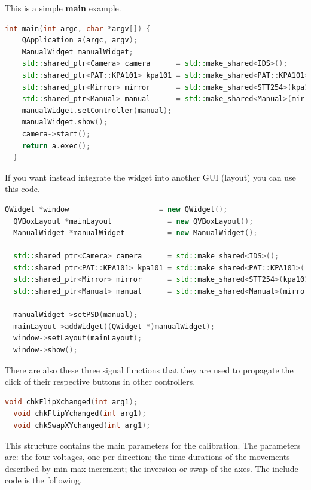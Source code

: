 This is a simple \textbf{main} example.

\begin{lstlisting}[language=c++, gobble=2]
  int main(int argc, char *argv[]) {
    QApplication a(argc, argv);
    ManualWidget manualWidget;
    std::shared_ptr<Camera> camera      = std::make_shared<IDS>();
    std::shared_ptr<PAT::KPA101> kpa101 = std::make_shared<PAT::KPA101>();
    std::shared_ptr<Mirror> mirror      = std::make_shared<STT254>(kpa101);
    std::shared_ptr<Manual> manual      = std::make_shared<Manual>(mirror, camera->getFrame()->getCentroid());
    manualWidget.setController(manual);
    manualWidget.show();
    camera->start();
    return a.exec();
  }
\end{lstlisting}


If you want instead integrate the widget into another GUI (layout) you
can use this code.

\begin{lstlisting}[language=c++, gobble=2]
  QWidget *window                     = new QWidget();
  QVBoxLayout *mainLayout             = new QVBoxLayout();
  ManualWidget *manualWidget          = new ManualWidget();
  
  std::shared_ptr<Camera> camera      = std::make_shared<IDS>();
  std::shared_ptr<PAT::KPA101> kpa101 = std::make_shared<PAT::KPA101>();
  std::shared_ptr<Mirror> mirror      = std::make_shared<STT254>(kpa101);
  std::shared_ptr<Manual> manual      = std::make_shared<Manual>(mirror, camera->getFrame()->getCentroid());
  
  manualWidget->setPSD(manual);
  mainLayout->addWidget((QWidget *)manualWidget);
  window->setLayout(mainLayout);
  window->show();
\end{lstlisting}


There are also these three signal functions that they are used to
propagate the click of their respective buttons in other controllers.

\begin{lstlisting}[language=c++, gobble=2]
  void chkFlipXchanged(int arg1);
  void chkFlipYchanged(int arg1);
  void chkSwapXYchanged(int arg1);
\end{lstlisting}



This structure contains the main parameters for the calibration. The
parameters are: the four voltages, one per direction; the time durations
of the movements described by min-max-increment; the inversion or swap
of the axes. The include code is the following.

